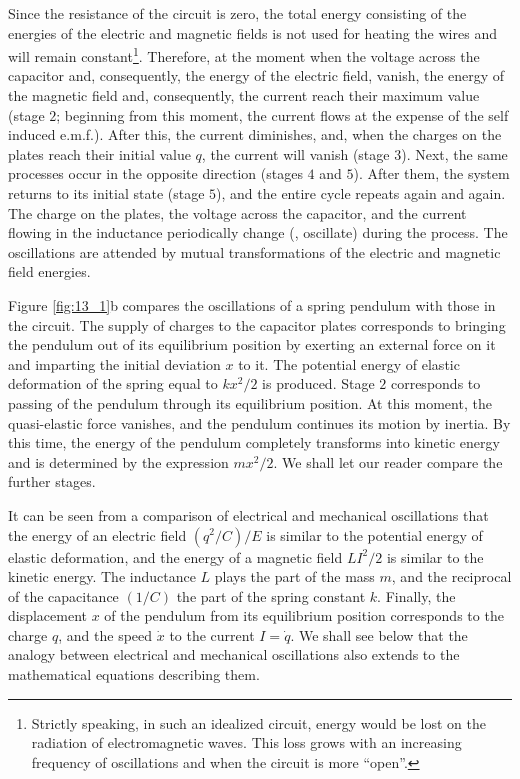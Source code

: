 Since the resistance of the circuit is zero, the total energy consisting of the energies of the electric and magnetic fields is not used for heating the wires and will remain constant\footnote{Strictly speaking, in such an idealized circuit, energy would be lost on the radiation of electromagnetic waves. This loss grows with an increasing frequency of oscillations and when the circuit is more ``open''.}.
Therefore, at the moment when the voltage across the capacitor and, consequently, the energy of the electric field, vanish, the energy of the magnetic field and, consequently, the current reach their maximum value (stage $2$; beginning from this moment, the current flows at the expense of the self induced e.m.f.).
After this, the current diminishes, and, when the charges on the plates reach their initial value $q$, the current will vanish (stage $3$).
Next, the same processes occur in the opposite direction (stages $4$ and $5$).
After them, the system returns to its initial state (stage $5$), and the entire cycle repeats again and again.
The charge on the plates, the voltage across the capacitor, and the current flowing in the inductance periodically change (\ie, oscillate) during the process.
The oscillations are attended by mutual transformations of the electric and magnetic field energies.

Figure \ref{fig:13_1}b compares the oscillations of a
spring pendulum with those in the circuit.
The supply of charges to the capacitor plates corresponds to bringing the pendulum out of its equilibrium position by exerting an external force on it and imparting the initial deviation $x$ to it.
The potential energy of elastic deformation of the spring equal to $kx^2/2$ is produced.
Stage $2$ corresponds to passing of the pendulum through its equilibrium position.
At this moment, the quasi-elastic force vanishes, and the pendulum continues its motion by inertia.
By this time, the energy of the pendulum completely transforms into kinetic energy and is determined by the expression $mx^2/2$.
We shall let our reader compare the further stages.

It can be seen from a comparison of electrical and mechanical oscillations that the energy of an electric field $(q^2/C)/E$ is similar to the potential energy of elastic deformation, and the energy of a magnetic field $LI^2/2$ is similar to the kinetic energy.
The inductance $L$ plays the part of the mass $m$, and the reciprocal of the capacitance $(1/C)$ the part of the spring constant $k$.
Finally, the displacement $x$ of the pendulum from its equilibrium position corresponds to the charge $q$, and the speed $\dot{x}$ to the current $I = \dot{q}$.
We shall see below that the analogy between electrical and mechanical oscillations also extends to the mathematical equations describing them.

